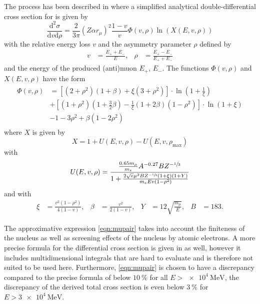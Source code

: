 The process has been described in \cite{Kelner2000} where a simplified analytical double-differential cross section for is given by
\begin{equation}
    \label{eqn:mupair}
    \frac{\mathrm{d}^2\sigma}{\mathrm{d}v \mathrm{d}\rho} = \frac{2}{3\pi} (Z \alpha r_\mu)^2 \frac{1-v}{v} \Phi(v, \rho) \ln \left( X \left(E, v, \rho \right) \right)
\end{equation}
with the relative energy loss $v$ and the asymmetry parameter $\rho$ defined by
\begin{align}
    v &= \frac{E_+ + E_-}{E}, & \rho &= \frac{E_+ - E_-}{E_+ + E_-}
\end{align}
and the energy of the produced (anti)muon $E_+$, $E_-$.
The functions $\Phi(v, \rho)$ and $X(E, v, \rho)$ have the form
\begin{align}
    \begin{split}
    \Phi(v, \rho) &= \left[ (2 + \rho^2) (1 + \beta) + \xi (3 + \rho^2) \right] \cdot \ln{ \left( 1 + \frac{1}{\xi} \right) }\\ &+ \left[ (1 + \rho^2) \left( 1 + \frac{3}{2} \beta \right) - \frac{1}{\xi} (1 + 2 \beta) (1 - \rho^2) \right] \cdot \ln{ (1 + \xi) }\\ &- 1 - 3 \rho^2 + \beta (1 - 2 \rho^2)
    \end{split}
\end{align}
where $X$ is given by
\begin{equation}
    X = 1 + U(E, v, \rho) - U(E, v, \rho_\text{max})
\end{equation}
with 
\begin{equation}
    U(E, v, \rho) = \frac{\frac{0.65 m_{\mu}}{m_e} A^{-0.27} B Z^{-\sfrac{1}{3}}}{1 + \frac{2 \sqrt{e} \mu^2 B Z^{-\sfrac{1}{3}} (1 + \xi) (1 + Y) }{m_e E v (1 - \rho^2)} }
\end{equation}
and with 
\begin{align}
    \xi &= \frac{v^2 (1 - \rho^2)}{4 (1 - v)}, & \beta &= \frac{v^2}{2 (1 - v)}, & Y &= 12 \sqrt{\frac{m_{\mu}}{E}}, & B &= 183.
\end{align}

The approximative expression \eqref{eqn:mupair} takes into account the finiteness of the nucleus as well as screening effects of the nucleus by atomic electrons.
A more precise formula for the differential cross section is given in \cite{Kelner2000} as well, however it includes multidimensional integrals that are hard to evaluate and is therefore not suited to be used here.
Furthermore, \eqref{eqn:mupair} is chosen to have a discrepancy compared to the precise formula of below $\SI{10}{\percent}$ for all $E > \SI{e4}{\mega\electronvolt}$, the discrepancy of the derived total cross section is even below $\SI{3}{\percent}$ for $E > \SI{3e4}{\mega\electronvolt}$.

